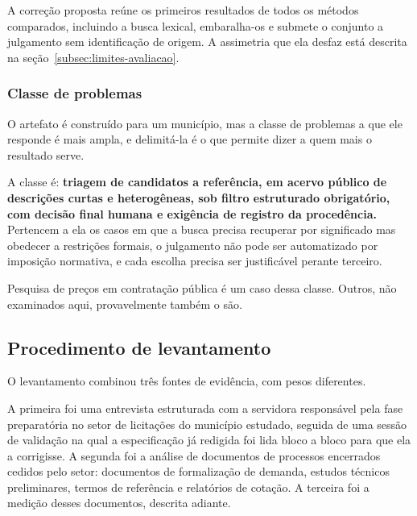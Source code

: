 A correção proposta reúne os primeiros resultados de todos os métodos
comparados, incluindo a busca lexical, embaralha-os e submete o conjunto a
julgamento sem identificação de origem. A assimetria que ela desfaz está
descrita na seção~\ref{subsec:limites-avaliacao}.


\subsubsection{Classe de problemas}
\label{subsec:classe-de-problemas}

O artefato é construído para um município, mas a classe de problemas a que ele
responde é mais ampla, e delimitá-la é o que permite dizer a quem mais o
resultado serve.

A classe é: \textbf{triagem de candidatos a referência, em acervo público de
descrições curtas e heterogêneas, sob filtro estruturado obrigatório, com
decisão final humana e exigência de registro da procedência.} Pertencem a ela os
casos em que a busca precisa recuperar por significado mas obedecer a restrições
formais, o julgamento não pode ser automatizado por imposição normativa, e cada
escolha precisa ser justificável perante terceiro.

Pesquisa de preços em contratação pública é um caso dessa classe. Outros,
não examinados aqui, provavelmente também o são.


\subsection{Procedimento de levantamento}
\label{subsec:procedimento-levantamento}

O levantamento combinou três fontes de evidência, com pesos diferentes.

A primeira foi uma entrevista estruturada com a servidora responsável pela fase
preparatória no setor de licitações do município estudado, seguida de uma sessão
de validação na qual a especificação já redigida foi lida bloco a bloco para que
ela a corrigisse. A segunda foi a análise de documentos de processos encerrados
cedidos pelo setor: documentos de formalização de demanda, estudos técnicos
preliminares, termos de referência e relatórios de cotação. A terceira foi a
medição desses documentos, descrita adiante.

